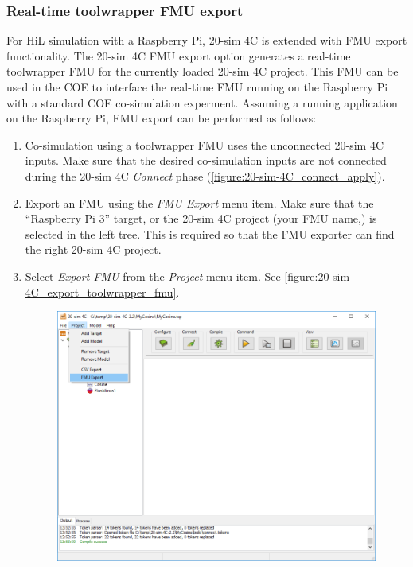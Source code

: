 \subsubsection{Real-time toolwrapper FMU export}\label{sec:simulators:20sim4C:fmuexport}
For HiL simulation with a Raspberry Pi, 20-sim 4C is extended with FMU export functionality.
%
The 20-sim 4C FMU export option generates a real-time toolwrapper FMU for the currently loaded 20-sim 4C project.
%
This FMU can be used in the COE to interface the real-time FMU running on the Raspberry Pi with a standard COE co-simulation experment. 
%
Assuming a running application on the Raspberry Pi, FMU export can be performed as follows:
%
%
%
\begin{enumerate}
\item Co-simulation using a toolwrapper FMU uses the unconnected 20-sim 4C inputs.  Make sure that the desired co-simulation inputs are not connected during the 20-sim 4C \textit{Connect} phase (\autoref{figure:20-sim-4C_connect_apply}).
%
\item Export an FMU using the \textit{FMU Export} menu item.  Make sure that the ``Raspberry Pi 3'' target, or the 20-sim 4C  project (your FMU name,) is selected in the left tree.  This is required so that the FMU exporter can find the right 20-sim 4C project.
%
\item Select \textit{Export FMU} from the \textit{Project} menu item. See \autoref{figure:20-sim-4C_export_toolwrapper_fmu}.
% 
\begin{figure}[hpt]
	\centerline{\includegraphics[width=\textwidth]{figures/20-sim-4C_export_toolwrapper_fmu.png}}

\end{figure}
\end{enumerate}
